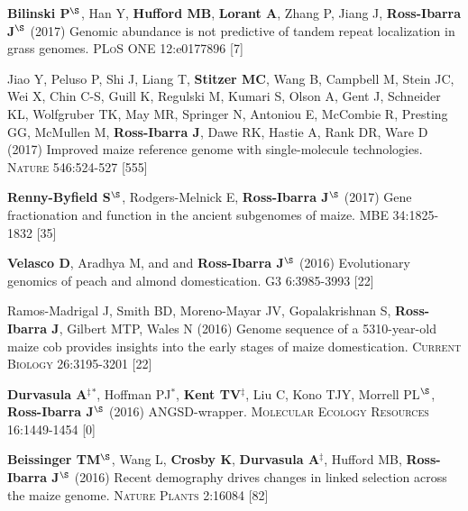 \documentclass[letterpaper,10pt]{article}
\begin{document}
\begin{etaremune}
\item {\bf Bilinski P}$^\S$, Han Y, {\bf Hufford MB}, {\bf Lorant A}, Zhang P, Jiang J, {\bf Ross-Ibarra J}$^\S$ (2017) Genomic abundance is not predictive of tandem repeat localization in grass genomes. \textsc{PLoS ONE} 12:e0177896
 [7]\\

\item  Jiao Y, Peluso P,  Shi J,  Liang T, {\bf Stitzer MC}, Wang B,  Campbell M, Stein JC,  Wei X,  Chin C-S,  Guill K,  Regulski M,  Kumari S,  Olson A,  Gent J, Schneider KL,  Wolfgruber TK, May MR, Springer N,  Antoniou E,  McCombie R, Presting GG,  McMullen M, {\bf Ross-Ibarra J}, Dawe RK,  Hastie A, Rank DR, Ware D (2017) Improved maize reference genome with single-molecule technologies. \textsc{Nature}  546:524-527
 [555]\\

\item  {\bf Renny-Byfield S}$^\S$, Rodgers-Melnick E, {\bf Ross-Ibarra J}$^\S$ (2017) Gene fractionation and function in the ancient subgenomes of maize. \textsc{MBE} 34:1825-1832
 [35]\\

\item {\bf Velasco D}, Aradhya M, and  and {\bf Ross-Ibarra J}$^\S$ (2016) Evolutionary genomics of peach and almond domestication. \textsc{G3} 6:3985-3993
 [22]\\

\item Ramos-Madrigal J, Smith BD, Moreno-Mayar JV, Gopalakrishnan S, {\bf Ross-Ibarra J}, Gilbert MTP, Wales N (2016) Genome sequence of a 5310-year-old maize cob provides insights into the early stages of maize domestication. \textsc{Current Biology} 26:3195-3201
 [22]\\

\item {\bf Durvasula A}$^\ddagger$$^*$,  Hoffman PJ$^*$, {\bf Kent TV}$^\ddagger$, Liu C, Kono TJY, Morrell PL$^\S$, {\bf Ross-Ibarra J}$^\S$ (2016) ANGSD-wrapper. \textsc{Molecular Ecology Resources} 16:1449-1454
 [0]\\

\item {\bf Beissinger TM}$^\S$, Wang L, {\bf Crosby K}, {\bf Durvasula A}$^\ddagger$, Hufford MB, {\bf Ross-Ibarra J}$^\S$ (2016)  Recent demography drives changes in linked selection across the maize genome. \textsc{Nature Plants} 2:16084
 [82]\\


\end{etaremune}
\end{document}
